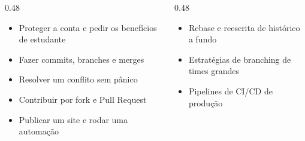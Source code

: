 \begin{frame}{}
  \vspace{0.5em}
  \begin{columns}[T]
    \begin{column}{0.48\textwidth}
      \begin{itemize}
        \item Proteger a conta e pedir os benefícios de estudante
        \item Fazer commits, branches e merges
        \item Resolver um conflito sem pânico
        \item Contribuir por fork e Pull Request
        \item Publicar um site e rodar uma automação
      \end{itemize}
    \end{column}
    \begin{column}{0.48\textwidth}
      \begin{itemize}
        \item Rebase e reescrita de histórico a fundo
        \item Estratégias de branching de times grandes
        \item Pipelines de CI/CD de produção
      \end{itemize}
    \end{column}
  \end{columns}

  \vspace{1.2em}
  \begin{center}
  \end{center}

\end{frame}

